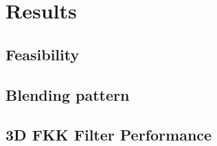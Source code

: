 \chapter{Results}

\section{Feasibility}

\section{Blending pattern}

\section{3D FKK Filter Performance}